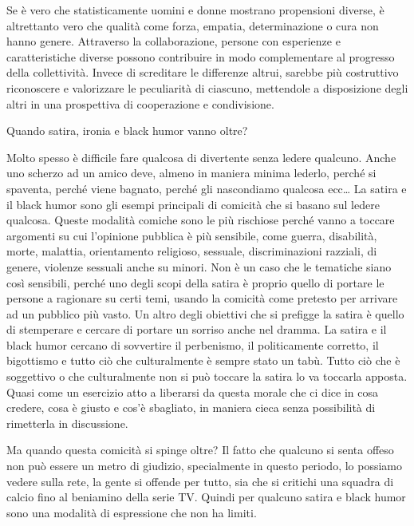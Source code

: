 \documentclass[12pt]{book} %
\begin{document}
Se è vero che statisticamente uomini e donne mostrano propensioni diverse, è altrettanto vero che qualità come forza, empatia, determinazione o cura non hanno genere. Attraverso la collaborazione, persone con esperienze e caratteristiche diverse possono contribuire in modo complementare al progresso della collettività. Invece di screditare le differenze altrui, sarebbe più costruttivo riconoscere e valorizzare le peculiarità di ciascuno, mettendole a disposizione degli altri in una prospettiva di cooperazione e condivisione.

\begin{mdframed}[linewidth=1pt]
Quando satira, ironia e black humor vanno oltre?

Molto spesso è difficile fare qualcosa di divertente senza ledere qualcuno. Anche uno scherzo ad un amico deve, almeno
in maniera minima lederlo, perché si spaventa, perché viene bagnato, perché gli nascondiamo qualcosa ecc… La satira e
il black humor sono gli esempi principali di comicità che si basano sul ledere qualcosa. Queste modalità comiche sono
le più rischiose perché vanno a toccare argomenti su cui l'opinione pubblica è più sensibile, come
guerra, disabilità, morte, malattia, orientamento religioso, sessuale, discriminazioni razziali, di genere, violenze
sessuali anche su minori. Non è un caso che le tematiche siano così sensibili, perché uno degli scopi della satira è
proprio quello di portare le persone a ragionare su certi temi, usando la comicità come pretesto per arrivare ad un
pubblico più vasto. Un altro degli obiettivi che si prefigge la satira è quello di stemperare e cercare di portare un
sorriso anche nel dramma. La satira e il black humor cercano di sovvertire il perbenismo, il politicamente corretto, il
bigottismo e tutto ciò che culturalmente è sempre stato un tabù. Tutto ciò che è soggettivo o che culturalmente non si
può toccare la satira lo va toccarla apposta. Quasi come un esercizio atto a liberarsi da questa morale che ci dice in
cosa credere, cosa è giusto e cos'è sbagliato, in maniera cieca senza possibilità di rimetterla in
discussione. 

Ma quando questa comicità si spinge oltre? Il fatto che qualcuno si senta offeso non può essere un metro di giudizio,
specialmente in questo periodo, lo possiamo vedere sulla rete, la gente si offende per tutto, sia che si critichi una
squadra di calcio fino al beniamino della serie TV. Quindi per qualcuno satira e black humor sono una modalità di
espressione che non ha limiti.


\end{mdframed}
\end{document}
